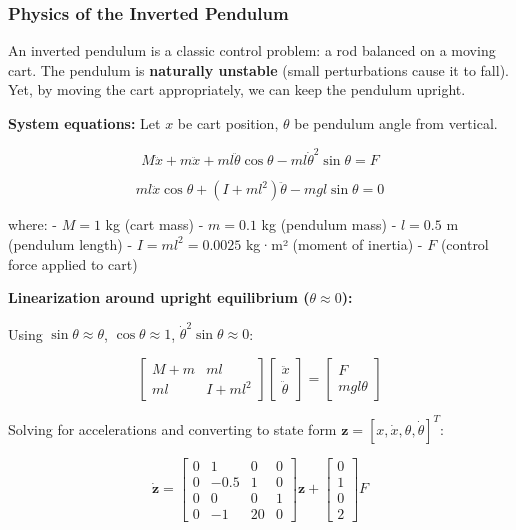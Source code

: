 \documentclass[
]{article}
\begin{document}
\subsubsection{Physics of the Inverted
Pendulum}\label{physics-of-the-inverted-pendulum}

An inverted pendulum is a classic control problem: a rod balanced on a
moving cart. The pendulum is \textbf{naturally unstable} (small
perturbations cause it to fall). Yet, by moving the cart appropriately,
we can keep the pendulum upright.

\textbf{System equations:} Let \(x\) be cart position, \(\theta\) be
pendulum angle from vertical.

\[M\ddot{x} + m\ddot{x} + ml\ddot{\theta}\cos\theta - ml\dot{\theta}^2\sin\theta = F\]

\[ml\ddot{x}\cos\theta + (I + ml^2)\ddot{\theta} - mgl\sin\theta = 0\]

where: - \(M = 1\) kg (cart mass) - \(m = 0.1\) kg (pendulum mass) -
\(l = 0.5\) m (pendulum length) - \(I = ml^2 = 0.0025\) kg·m² (moment of
inertia) - \(F\) (control force applied to cart)

\textbf{Linearization around upright equilibrium
(\(\theta \approx 0\)):}

Using \(\sin\theta \approx \theta\), \(\cos\theta \approx 1\),
\(\dot{\theta}^2 \sin\theta \approx 0\):

\[\begin{bmatrix} M+m & ml \\ ml & I + ml^2 \end{bmatrix} \begin{bmatrix} \ddot{x} \\ \ddot{\theta} \end{bmatrix} = \begin{bmatrix} F \\ mgl\theta \end{bmatrix}\]

Solving for accelerations and converting to state form
\(\mathbf{z} = [x, \dot{x}, \theta, \dot{\theta}]^T\):

\[\dot{\mathbf{z}} = \begin{bmatrix} 0 & 1 & 0 & 0 \\ 0 & -0.5 & 1 & 0 \\ 0 & 0 & 0 & 1 \\ 0 & -1 & 20 & 0 \end{bmatrix}\mathbf{z} + \begin{bmatrix} 0 \\ 1 \\ 0 \\ 2 \end{bmatrix}F\]
\end{document}
